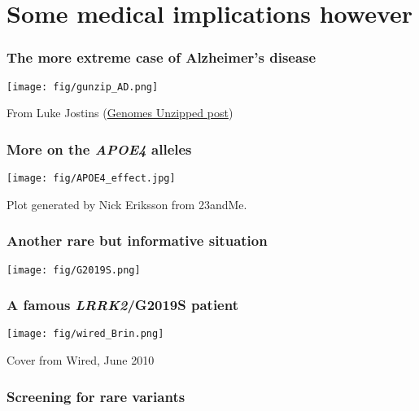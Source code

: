 \documentclass{beamer}
\begin{document}
\section{Some medical implications however}


\begin{frame}
  \frametitle{The more extreme case of Alzheimer's disease}
  \begin{center} 
    \texttt{[image: fig/gunzip\_AD.png]}
  \end{center}
  From Luke Jostins (\href{http://www.genomesunzipped.org/2011/05/calculating-your-alzheimers-risk.php}{Genomes Unzipped post}) 
\end{frame}



\begin{frame}
  \frametitle{More on the {\it APOE4} alleles}
  \begin{center} 
    \texttt{[image: fig/APOE4\_effect.jpg]}
  \end{center}
  Plot generated by Nick Eriksson from 23andMe.
\end{frame}




\begin{frame}
  \frametitle{Another rare but informative situation}
  \begin{center} 
    \texttt{[image: fig/G2019S.png]}
  \end{center}
\end{frame}


\begin{frame}
  \frametitle{A famous {\it LRRK2}/G2019S patient}
  \begin{center} 
    \texttt{[image: fig/wired\_Brin.png]}
  \end{center}
  Cover from Wired, June 2010
\end{frame}


\begin{frame}
  \frametitle{Screening for rare variants}
  \begin{center}
  \end{center}
\end{frame}
\end{document}
